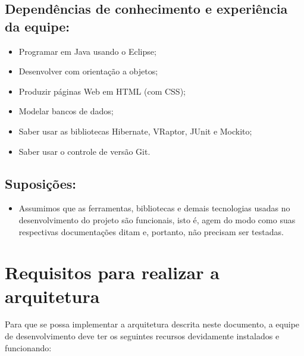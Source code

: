 \documentclass[11pt, a4paper]{article}
\begin{document}
        \subsection{Dependências de conhecimento e experiência da equipe:}
            \begin{itemize}
                \item Programar em Java usando o Eclipse;
                
                \item Desenvolver com orientação a objetos;
                
                \item Produzir páginas Web em HTML (com CSS);
                
                \item Modelar bancos de dados;
                
                \item Saber usar as bibliotecas Hibernate, VRaptor, JUnit e
                Mockito;
                
                \item Saber usar o controle de versão Git.
            \end{itemize}

        \subsection{Suposições:}
            \begin{itemize}
                \item Assumimos que as ferramentas, bibliotecas e demais
                tecnologias usadas no desenvolvimento do projeto são funcionais,
                isto é, agem do modo como suas respectivas documentações ditam
                e, portanto, não precisam ser testadas.
            \end{itemize}

    \section{Requisitos para realizar a arquitetura}
        Para que se possa implementar a arquitetura descrita neste documento, a
        equipe de desenvolvimento deve ter os seguintes recursos devidamente
        instalados e funcionando:
\end{document}
